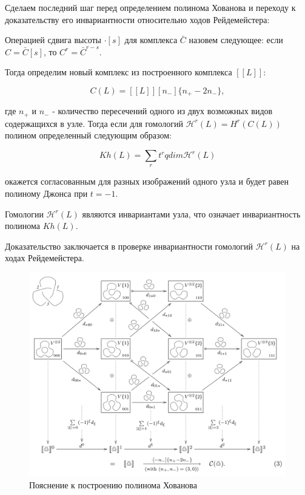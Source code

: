 \documentclass[a4paper,8pt]{extarticle}
\begin{document}
\begin{multicols}{2}
    Сделаем последний шаг перед определением полинома Хованова и переходу
    к доказательству его инвариантности относительно ходов 
    Рейдемейстера:
    
    \begin{definition}
    	Операцией сдвига высоты $\cdot [s]$ для комплекса $\bar{C}$ назовем 
    	следующее: если $C = \bar{C}[s]$, то $C^r = \bar{C}^{r-s}$.
    \end{definition}

	Тогда определим новый комплекс из построенного комплекса $[\![ L ]\!]$:
	
	\begin{equation}
		C(L) = [\![ L ]\!][n_-]\{n_+ - 2n_-\},
	\end{equation}

	где $n_+$ и $n_-$ - количество пересечений одного из двух 
    возможных видов содержащихся в узле. Тогда если для гомологий 
    $\mathcal{H}^r(L) = H^r(C(L))$ полином определенный следующим образом:
	
	\begin{equation}
		Kh(L) = \sum\limits_r t^r qdim \mathcal{H}^r(L)
	\end{equation}

	окажется согласованным для разных изображений одного узла и будет равен полиному Джонса при $t = -1$.

    \begin{tcolorbox}
        \begin{theorem}
            Гомологии $\mathcal{H}^r(L)$ являются инвариантами узла,
             что означает инвариантность полинома $Kh(L)$. 
        \end{theorem}
    \end{tcolorbox}

    Доказательство заключается в проверке инвариантности гомологий
    $\mathcal{H}^r(L)$ на ходах Рейдемейстера.

\end{multicols}

\begin{figure}[h]
  \centering
  \includegraphics[width=0.8\linewidth]{../img/bar-natan-2.png}
  \caption{Пояснение к построению полинома Хованова \parencite{bar-natan}}
  \label{fig:bar-natan-2}
\end{figure}

\printbibliography
\end{document}
